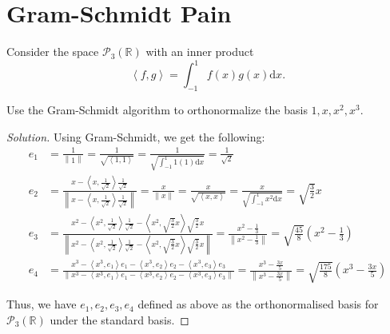 \documentclass{article}
\newenvironment{solution}{\begin{proof}[Solution]}{\end{proof}}
\newcommand{\norm}[1]{\left\lVert{#1}\right\rVert}
\newcommand{\RR}{\mathbb{R}}
\newcommand{\innerproduct}[2]{\left\langle{#1}, {#2}\right\rangle}
\begin{document}
	\section{Gram-Schmidt Pain}
	\begin{hw}
		Consider the space $\mathscr{P}_{3}(\RR)$ with an inner product
		\begin{equation*}
			\innerproduct{f}{g} = \int_{-1}^{1} f(x)g(x) \mathrm dx.
		\end{equation*}
	
		Use the Gram-Schmidt algorithm to orthonormalize the basis $1, x, x^{2}, x^{3}$.
	\end{hw}
	\begin{solution}
		Using Gram-Schmidt, we get the following:
		\begin{align*}
			e_{1} &= \frac{1}{\norm{1}} = \frac{1}{\sqrt{\innerproduct{1}{1}}} = \frac{1}{\sqrt{\int_{-1}^{1} 1(1) \mathrm dx}} = \frac{1}{\sqrt{2}} \\
			e_{2} &= \frac{x - \innerproduct{x}{\frac{1}{\sqrt 2}} \frac{1}{\sqrt 2}}{\norm{x - \innerproduct{x}{\frac{1}{\sqrt 2}} \frac{1}{\sqrt 2}}} = \frac{x}{\norm{x}} = \frac{x}{\sqrt{\innerproduct{x}{x}}} = \frac{x}{\sqrt{\int_{-1}^{1} x^{2} \mathrm dx}} = \sqrt{\frac{3}{2}} x \\
			e_{3} &= \frac{x^{2} - \innerproduct{x^{2}}{\frac{1}{\sqrt 2}}\frac{1}{\sqrt 2} - \innerproduct{x^{2}}{\sqrt{\frac{3}{2}}x} \sqrt{\frac{3}{2}} x}{\norm{x^{2} - \innerproduct{x^{2}}{\frac{1}{\sqrt 2}}\frac{1}{\sqrt 2} - \innerproduct{x^{2}}{\sqrt{\frac{3}{2}}x} \sqrt{\frac{3}{2}} x}} = \frac{x^{2} - \frac{1}{3}}{\norm{x^{2} - \frac{1}{3}}} = \sqrt{\frac{45}{8}}\left( x^{2} - \frac{1}{3} \right) \\
			e_{4} &= \frac{x^{3} - \innerproduct{x^{3}}{e_{1}}e_{1} - \innerproduct{x^{3}}{e_{2}} e_{2} - \innerproduct{x^{3}}{e_{3}} e_{3}}{\norm{x^{3} - \innerproduct{x^{3}}{e_{1}}e_{1} - \innerproduct{x^{3}}{e_{2}} e_{2} - \innerproduct{x^{3}}{e_{3}} e_{3}}} = \frac{x^{3} - \frac{3x}{5}}{\norm{x^{3} - \frac{3x}{5}}} = \sqrt{\frac{175}{8}}\left( x^{3} - \frac{3x}{5} \right)
		\end{align*}
	
		Thus, we have $e_{1}, e_{2}, e_{3}, e_{4}$ defined as above as the orthonormalised basis for $\mathscr{P}_{3}(\RR)$ under the standard basis.
	\end{solution}
	
	
	\newpage
	
\end{document}
